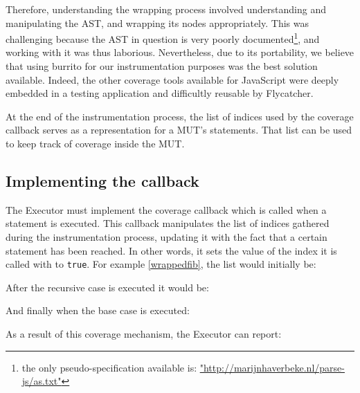 Therefore, understanding the wrapping process involved understanding and manipulating the AST, and wrapping its nodes appropriately. This was challenging because the AST in question is very poorly documented\footnote{the only pseudo-specification available is: \scriptsize{\url{"http://marijnhaverbeke.nl/parse-js/as.txt"}}}, and working with it was thus laborious. Nevertheless, due to its portability, we believe that using \textsf{burrito} for our instrumentation purposes was the best solution available. Indeed, the other coverage tools available for JavaScript were deeply embedded in a testing application and difficultly reusable by \textsf{Flycatcher}.

At the end of the instrumentation process, the list of indices used by the coverage callback serves as a representation for a MUT's statements. That list can be used to keep track of coverage inside the MUT.

\subsection{Implementing the callback}
The \textsf{Executor} must implement the coverage callback which is called when a statement is executed. This callback manipulates the list of indices gathered during the instrumentation process, updating it with the fact that a certain statement has been reached. In other words, it sets the value of the index it is called with to \texttt{true}. For example \ref{wrappedfib}, the list would initially be:

\begin{code}
\end{code}

\noindent After the recursive case is executed it would be:

\begin{code}
\end{code}

\noindent And finally when the base case is executed:

\begin{code}
\end{code}

As a result of this coverage mechanism, the \textsf{Executor} can report:

